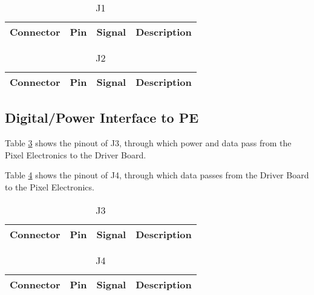 \documentclass[a4paper,12pt]{article}
\begin{document}
\begin{table}[h]
\centering
\begin{tabular}{|l|l|l|l|}
\hline
 Connector & Pin & Signal & Description \\
\hline

\hline
\end{tabular}
\caption{J1}
\label{J1}
\end{table}

\begin{table}[h]
\centering
{\small
\begin{tabular}{|l|l|l|l|}
\hline
 Connector & Pin & Signal & Description \\
\hline

\hline
\end{tabular}
}
\caption{J2}
\label{J2}
\end{table}

\subsection{Digital/Power Interface to PE}

Table \ref{J3} shows the pinout of J3, through which power and data pass from the Pixel Electronics to the Driver Board.

Table \ref{J4} shows the pinout of J4, through which data passes from the Driver Board to the Pixel Electronics.

\begin{table}[h]
\centering
{\small
\begin{tabular}{|l|l|l|l|}
\hline
 Connector & Pin & Signal & Description \\
\hline

\hline
\end{tabular}
}
\caption{J3}
\label{J3}
\end{table}

\begin{table}[h]
\centering
{\small
\begin{tabular}{|l|l|l|l|}
\hline
 Connector & Pin & Signal & Description \\
\hline

\hline
\end{tabular}
}
\caption{J4}
\label{J4}
\end{table}


  
\end{document}
